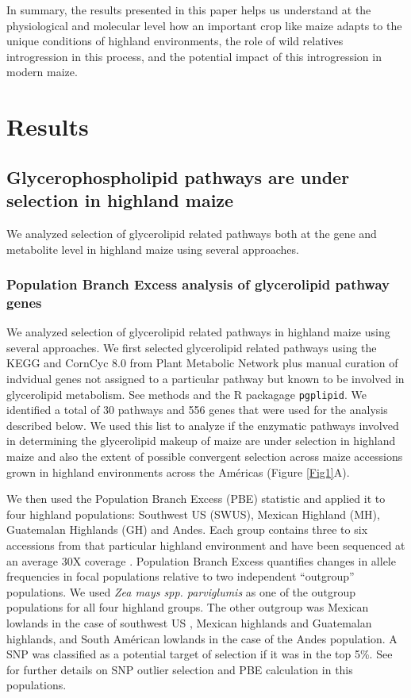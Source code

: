 \documentclass[9pt,twocolumn,twoside]{BioRxiv}
\begin{document}
In summary, the results presented in this paper helps us understand at the physiological and molecular level how an important crop like maize adapts to the unique conditions of highland environments, the role of wild relatives introgression in this process, and the potential impact of this introgression in modern maize.

\section{Results}
\label{sec:results}

\subsection{Glycerophospholipid pathways are under selection in  highland maize} 
We analyzed selection of glycerolipid related pathways both at the gene and metabolite level in highland maize using several approaches. 

\subsubsection{Population Branch Excess analysis of glycerolipid pathway genes} 
We analyzed selection of glycerolipid related pathways in highland maize using several approaches.
We first selected glycerolipid related pathways using the KEGG \citep{kanehisa2019} and CornCyc 8.0 from  Plant Metabolic Network \citep{Schlapfer2017-yl} plus manual curation of indvidual genes not assigned to a particular pathway but known to be involved in glycerolipid metabolism. See methods and the R packagage \verb|pgplipid|. 
We identified a total of 30 pathways and 556 genes that were used for the analysis described below. 
We used this list to analyze if the enzymatic pathways involved in determining the glycerolipid makeup of maize are under selection in highland maize and also the extent of possible convergent selection across maize accessions grown in highland environments across the Américas (Figure \ref{Fig1}A).  

We then used the Population Branch Excess (PBE) statistic \citep{Pool2017-oa} and applied it to four highland populations: Southwest US (SWUS), Mexican Highland (MH), Guatemalan Highlands (GH) and Andes. 
Each group contains three to six accessions from that particular highland environment and have been sequenced at an average 30X coverage \citep{Wang2017-bc, Wang2020-mp}. Population Branch Excess quantifies changes in allele frequencies in focal populations relative to two independent “outgroup” populations. 
We used \textit{Zea mays spp. parviglumis} as one of the outgroup populations for all four highland groups.  
The other outgroup was  Mexican lowlands  in the case of southwest US , Mexican highlands and Guatemalan highlands, and South Américan lowlands in the case of the Andes population. 
A SNP was classified as a potential target of selection if it was in the top 5\%. See \cite{Wang2020-mp} for further details on SNP outlier selection and PBE calculation in this populations. 
\end{document}

